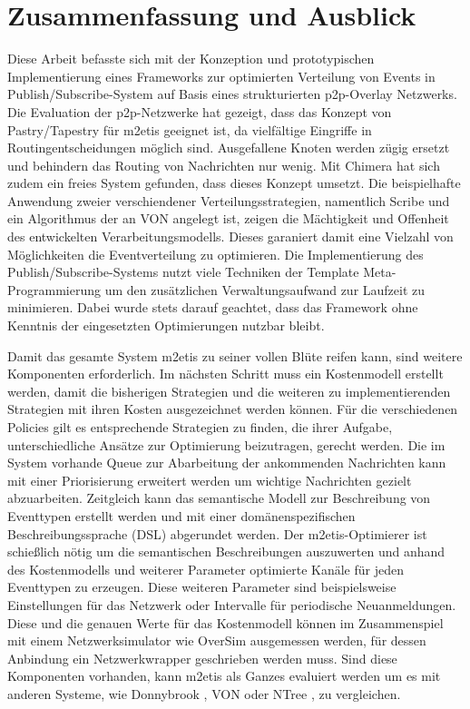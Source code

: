 \chapter{Zusammenfassung und Ausblick} 
\label{chap:zus}
Diese Arbeit befasste sich mit der Konzeption und prototypischen Implementierung eines Frameworks zur optimierten Verteilung von Events in Publish/Subscribe-System auf Basis eines strukturierten p2p-Overlay Netzwerks.\\
Die Evaluation der p2p-Netzwerke hat gezeigt, dass das Konzept von Pastry/Tapestry für \ac{m2etis} geeignet ist, da vielfältige Eingriffe in Routingentscheidungen möglich sind. Ausgefallene Knoten werden zügig ersetzt und behindern das Routing von Nachrichten nur wenig. Mit  Chimera hat sich zudem ein freies System gefunden, dass dieses Konzept umsetzt. Die beispielhafte Anwendung zweier verschiendener Verteilungsstrategien, namentlich Scribe und ein Algorithmus der an VON angelegt ist, zeigen die Mächtigkeit und Offenheit des entwickelten Verarbeitungsmodells. Dieses garaniert damit eine Vielzahl von Möglichkeiten die Eventverteilung zu optimieren. Die Implementierung des Publish/Subscribe-Systems nutzt viele Techniken der Template Meta-Programmierung um den zusätzlichen Verwaltungsaufwand zur Laufzeit zu minimieren. Dabei wurde stets darauf geachtet, dass das Framework ohne Kenntnis der eingesetzten Optimierungen nutzbar bleibt.

Damit das gesamte System \ac{m2etis} zu seiner vollen Blüte reifen kann, sind weitere Komponenten erforderlich. Im nächsten Schritt muss ein Kostenmodell erstellt werden, damit die bisherigen Strategien und die weiteren zu implementierenden Strategien mit ihren Kosten ausgezeichnet werden können. Für die verschiedenen Policies gilt es entsprechende Strategien zu finden, die ihrer Aufgabe, unterschiedliche Ansätze zur Optimierung beizutragen, gerecht werden. Die im System vorhande Queue zur Abarbeitung der ankommenden Nachrichten kann mit einer Priorisierung erweitert werden um wichtige Nachrichten gezielt abzuarbeiten. Zeitgleich kann das semantische Modell zur Beschreibung von Eventtypen erstellt werden und mit einer domänenspezifischen Beschreibungssprache (DSL) abgerundet werden. Der \ac{m2etis}-Optimierer ist schießlich nötig um die semantischen Beschreibungen auszuwerten und anhand des Kostenmodells und weiterer Parameter optimierte Kanäle für jeden Eventtypen zu erzeugen. Diese weiteren Parameter sind beispielsweise Einstellungen für das Netzwerk oder Intervalle für periodische Neuanmeldungen. Diese und die genauen Werte für das Kostenmodell können im Zusammenspiel mit einem Netzwerksimulator wie OverSim \cite{Baumgart2007OverSim} ausgemessen werden, für dessen Anbindung ein Netzwerkwrapper geschrieben werden muss. Sind diese Komponenten vorhanden, kann \ac{m2etis} als Ganzes evaluiert werden um es mit anderen Systeme, wie Donnybrook \cite{Bharambe2008Donnybrook}, VON \cite{Hu2006VON} oder NTree \cite{GauthierDickey2005Using}, zu vergleichen.
